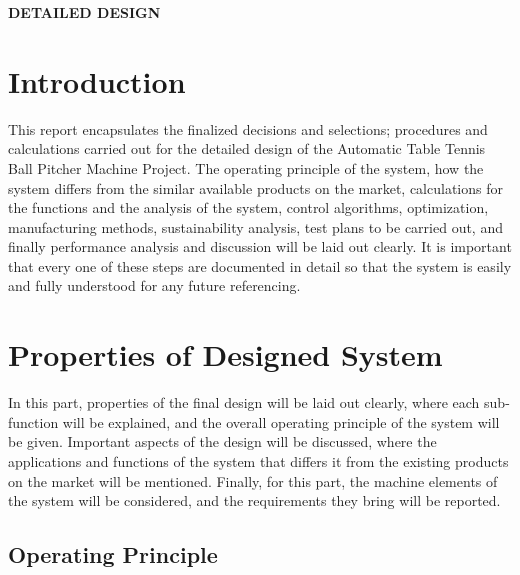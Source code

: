 \documentclass[12pt]{article}
\begin{document}
\begin{center}
    \vspace{1em} %
    \textbf{\LARGE DETAILED DESIGN}\\
    \vspace{1em} %
\end{center}

\section{Introduction}

This report encapsulates the finalized decisions and selections; procedures and calculations carried out for the detailed design of the Automatic Table Tennis Ball Pitcher Machine Project. The operating principle of the system, how the system differs from the similar available products on the market, calculations for the functions and the analysis of the system, control algorithms, optimization, manufacturing methods, sustainability analysis, test plans to be carried out, and finally performance analysis and discussion will be laid out clearly. It is important that every one of these steps are documented in detail so that the system is easily and fully understood for any future referencing.

\section{Properties of Designed System}

In this part, properties of the final design will be laid out clearly, where each sub-function will be explained, and the overall operating principle of the system will be given. Important aspects of the design will be discussed, where the applications and functions of the system that differs it from the existing products on the market will be mentioned. Finally, for this part, the machine elements of the system will be considered, and the requirements they bring will be reported.

\subsection{Operating Principle}
\end{document}
